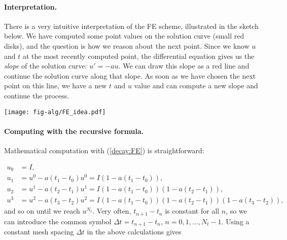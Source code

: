 \documentclass[graybox,sectrefs,envcountresetchap,open=right,final]{svmonodo}
\begin{document}
\paragraph{Interpretation.}
There is a very intuitive interpretation of the FE scheme, illustrated
in the sketch below. We have computed some point values
on the solution curve (small red disks), and the question is how we reason
about the next point. Since we know $u$ and $t$ at the most recently
computed point, the differential equation gives us the \emph{slope} of
the solution curve: $u'=-au$. We can draw this slope as a red line
and continue the solution curve along that slope. As soon as we have
chosen the next point on this line, we have a new $t$ and $u$ value and
can compute a new slope and continue the process.



\vspace{3mm}




\vspace{3mm}





\centerline{\texttt{[image: fig-alg/FE\_idea.pdf]}}





\vspace{3mm}




\vspace{3mm}



\paragraph{Computing with the recursive formula.}
Mathematical computation with (\ref{decay:FE}) is straightforward:

\begin{align*}
u_0 &= I,\\ 
u_1 & = u^0 - a(t_{1} -t_0)u^0 = I(1-a(t_1-t_0)),\\ 
u_2 & = u^1 - a(t_{2} -t_1)u^1 = I(1-a(t_1-t_0))(1 - a(t_2-t_1)),\\ 
u^3 &= u^2 - a(t_{3} -t_2)u^2 = I(1-a(t_1-t_0))(1 - a(t_2-t_1))(1 - a(t_3-t_2)),
\end{align*}
and so on until we reach $u^{N_t}$.
Very often, $t_{n+1}-t_n$ is constant for all $n$, so we can introduce
the common symbol
$\Delta t = t_{n+1}-t_n$, $n=0,1,\ldots,N_t-1$.
Using a constant mesh spacing $\Delta t$ in the above calculations gives
\end{document}
